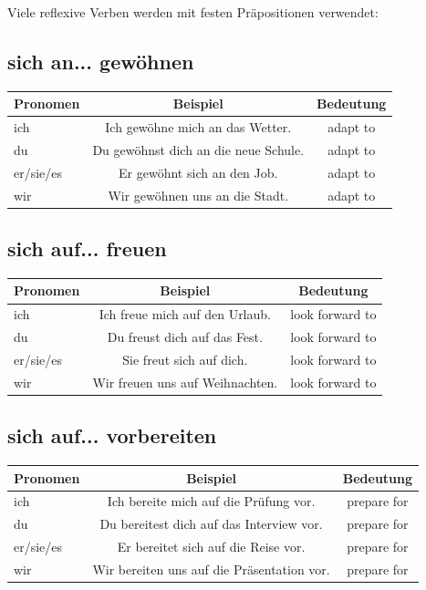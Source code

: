Viele reflexive Verben werden mit festen Präpositionen verwendet:

\subsection{sich an... gewöhnen}
\begin{center}
\begin{tabular}{|l|c|c|}
\hline
\textbf{Pronomen} & \textbf{Beispiel} & \textbf{Bedeutung} \\ \hline
ich & Ich gewöhne mich an das Wetter. & adapt to \\ \hline
du & Du gewöhnst dich an die neue Schule. & adapt to \\ \hline
er/sie/es & Er gewöhnt sich an den Job. & adapt to \\ \hline
wir & Wir gewöhnen uns an die Stadt. & adapt to \\ \hline
\end{tabular}
\end{center}

\subsection{sich auf... freuen}
\begin{center}
\begin{tabular}{|l|c|c|}
\hline
\textbf{Pronomen} & \textbf{Beispiel} & \textbf{Bedeutung} \\ \hline
ich & Ich freue mich auf den Urlaub. & look forward to \\ \hline
du & Du freust dich auf das Fest. & look forward to \\ \hline
er/sie/es & Sie freut sich auf dich. & look forward to \\ \hline
wir & Wir freuen uns auf Weihnachten. & look forward to \\ \hline
\end{tabular}
\end{center}

\subsection{sich auf... vorbereiten}
\begin{center}
\begin{tabular}{|l|c|c|}
\hline
\textbf{Pronomen} & \textbf{Beispiel} & \textbf{Bedeutung} \\ \hline
ich & Ich bereite mich auf die Prüfung vor. & prepare for \\ \hline
du & Du bereitest dich auf das Interview vor. & prepare for \\ \hline
er/sie/es & Er bereitet sich auf die Reise vor. & prepare for \\ \hline
wir & Wir bereiten uns auf die Präsentation vor. & prepare for \\ \hline
\end{tabular}
\end{center}


